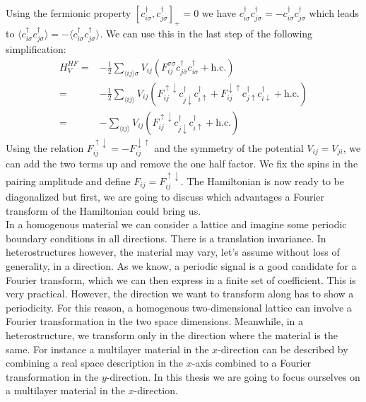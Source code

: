 \documentclass[../main.tex]{subfile}
\begin{document}
Using the fermionic property $[c_{i\sigma}^{\dagger},c_{j\sigma}^{\dagger}]_+ = 0$ we have $c_{i\sigma}^{\dagger} c_{j\sigma}^{\dagger} = -c_{i\sigma}^{\dagger} c_{j\sigma}^{\dagger}$
which leads to $\langle  c_{i\sigma}^{\dagger} c_{j\sigma}^{\dagger} \rangle = -\langle c_{i\sigma}^{\dagger} c_{j\sigma}^{\dagger}\rangle$. We can use this in the last step of the following simplification:
\begin{equation}\label{eq:HF_V}
    \begin{aligned}
        H^{HF}_V =& -\frac{1}{2} \sum_{\langle ij\rangle \sigma} V_{ij} \left(F_{ij}^{\sigma \bar{\sigma}} c^{\dagger}_{j\bar{\sigma}}c^{\dagger}_{i\sigma} + \text{h.c.}\right)\\
            =& -\frac{1}{2}\sum_{\langle ij\rangle} V_{ij} \left(F_{ij}^{\uparrow \downarrow} c^{\dagger}_{j\downarrow}c^{\dagger}_{i\uparrow} + F_{ij}^{\downarrow\uparrow} c^{\dagger}_{j\uparrow}c^{\dagger}_{i\downarrow} + \text{h.c.}\right)\\
            =& -\sum_{\langle ij\rangle} V_{ij} \left(F_{ij}^{\uparrow \downarrow} c^{\dagger}_{j\downarrow}c^{\dagger}_{i\uparrow} + \text{h.c.}\right)
    \end{aligned}
\end{equation}
Using the relation $F_{ij}^{\uparrow\downarrow} = -F_{ij}^{\downarrow\uparrow}$ and the symmetry of the potential $V_{ij} = V_{ji}$, we can add the two terms up and remove the one half factor.
We fix the spins in the pairing amplitude and define $F_{ij} = F_{ij}^{\uparrow\downarrow}$.
The Hamiltonian is now ready to be diagonalized but first, we are going to discuss which advantages a Fourier transform of the Hamiltonian could bring us.\\
 
In a homogenous material we can consider a lattice and imagine some periodic boundary conditions in all directions. There is a translation invariance.
In heterostructures however, the material may vary, let's assume
without loss of generality, in a direction. As we know, a periodic signal is a good candidate for a Fourier transform, which we can then express in a finite set of coefficient. 
This is very practical.
However, the direction we want to transform along has to show a periodicity. For this reason, a homogenous two-dimensional lattice can involve a Fourier transformation
in the two space dimensions. Meanwhile, in a heterostructure,
we transform only in the direction where the material is the same. For instance a multilayer material in the $x$-direction can be described by combining a real space description in the $x$-axis 
combined to a Fourier transformation in the $y$-direction.
In this thesis we are going to focus ourselves on a multilayer material in the $x$-direction.\\
\end{document}
